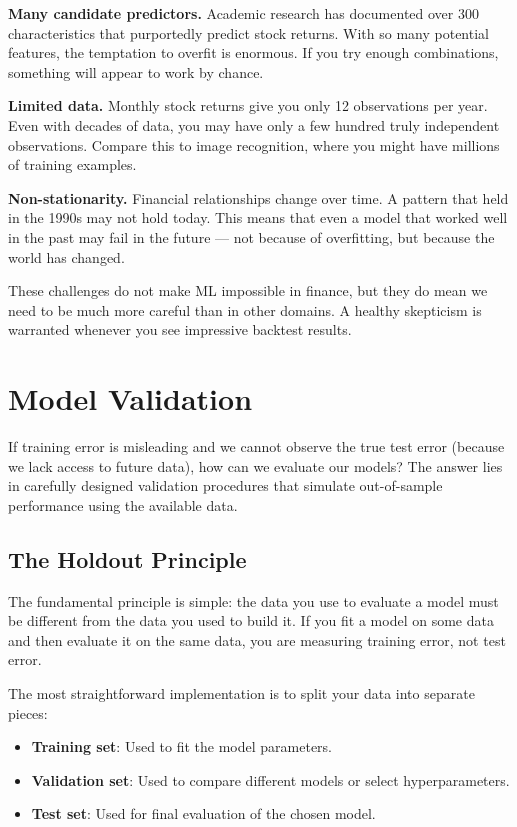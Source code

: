 \documentclass[11pt,a4paper]{article}
\begin{document}
\textbf{Many candidate predictors.} Academic research has documented over 300 characteristics that purportedly predict stock returns. With so many potential features, the temptation to overfit is enormous. If you try enough combinations, something will appear to work by chance.

\textbf{Limited data.} Monthly stock returns give you only 12 observations per year. Even with decades of data, you may have only a few hundred truly independent observations. Compare this to image recognition, where you might have millions of training examples.

\textbf{Non-stationarity.} Financial relationships change over time. A pattern that held in the 1990s may not hold today. This means that even a model that worked well in the past may fail in the future — not because of overfitting, but because the world has changed.

These challenges do not make ML impossible in finance, but they do mean we need to be much more careful than in other domains. A healthy skepticism is warranted whenever you see impressive backtest results.

\section{Model Validation}

If training error is misleading and we cannot observe the true test error (because we lack access to future data), how can we evaluate our models? The answer lies in carefully designed validation procedures that simulate out-of-sample performance using the available data.

\subsection{The Holdout Principle}

The fundamental principle is simple: the data you use to evaluate a model must be different from the data you used to build it. If you fit a model on some data and then evaluate it on the same data, you are measuring training error, not test error.

The most straightforward implementation is to split your data into separate pieces:

\begin{itemize}
    \item \textbf{Training set}: Used to fit the model parameters.
    \item \textbf{Validation set}: Used to compare different models or select hyperparameters.
    \item \textbf{Test set}: Used for final evaluation of the chosen model.
\end{itemize}
\end{document}
